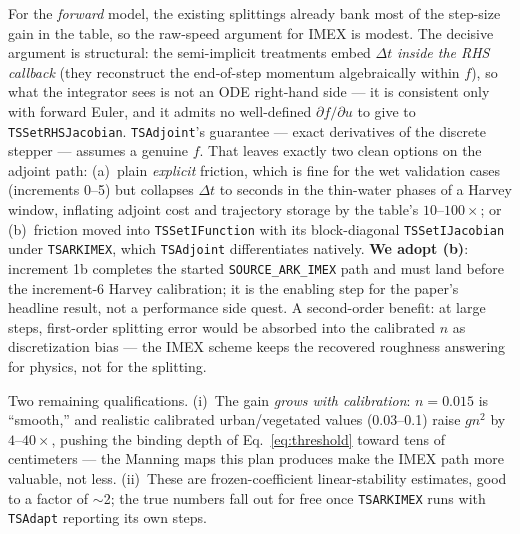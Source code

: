 \documentclass[11pt]{article}
\begin{document}
For the \emph{forward} model, the existing splittings already bank most
of the step-size gain in the table, so the raw-speed argument for IMEX
is modest. The decisive argument is structural: the semi-implicit
treatments embed $\Delta t$ \emph{inside the RHS callback} (they
reconstruct the end-of-step momentum algebraically within $f$), so what
the integrator sees is not an ODE right-hand side --- it is consistent
only with forward Euler, and it admits no well-defined
$\partial f/\partial u$ to give to \texttt{TSSetRHSJacobian}.
\texttt{TSAdjoint}'s guarantee --- exact derivatives of the discrete
stepper --- assumes a genuine $f$. That leaves exactly two clean
options on the adjoint path: (a)~plain \emph{explicit} friction, which
is fine for the wet validation cases (increments 0--5) but collapses
$\Delta t$ to seconds in the thin-water phases of a Harvey window,
inflating adjoint cost and trajectory storage by the table's
$10$--$100\times$; or (b)~friction moved into \texttt{TSSetIFunction}
with its block-diagonal \texttt{TSSetIJacobian} under
\texttt{TSARKIMEX}, which \texttt{TSAdjoint} differentiates natively.
\textbf{We adopt (b)}: increment 1b completes the started
\texttt{SOURCE\_ARK\_IMEX} path and must land before the increment-6
Harvey calibration; it is the enabling step for the paper's headline
result, not a performance side quest. A second-order benefit: at large
steps, first-order splitting error would be absorbed into the
calibrated $n$ as discretization bias --- the IMEX scheme keeps the
recovered roughness answering for physics, not for the splitting.

Two remaining qualifications. (i)~The gain \emph{grows with
calibration}: $n=0.015$ is ``smooth,'' and realistic calibrated
urban/vegetated values (0.03--0.1) raise $g n^2$ by
$4$--$40\times$, pushing the binding depth of
Eq.~\eqref{eq:threshold} toward tens of centimeters --- the Manning
maps this plan produces make the IMEX path more valuable, not less.
(ii)~These are frozen-coefficient linear-stability estimates, good to
a factor of $\sim$2; the true numbers fall out for free once
\texttt{TSARKIMEX} runs with \texttt{TSAdapt} reporting its own steps.



\end{document}
